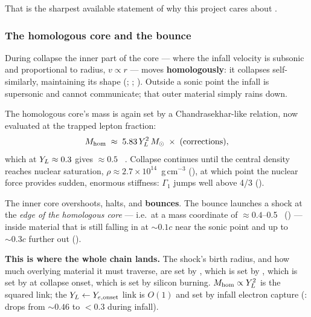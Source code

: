 That is the sharpest available statement of why this project cares about \Ye.

\subsubsection{The homologous core and the bounce}
\label{sec:homologous}

During collapse the inner part of the core --- where the infall velocity is
subsonic and proportional to radius, $v \propto r$ --- moves
\textbf{homologously}: it collapses self-similarly, maintaining its shape
(\citealt{goldreich1980}; \citealt{yahil1983}; \citealt{janka2017}). Outside a
sonic point the infall is supersonic and cannot communicate; that outer
material simply rains down.

The homologous core's mass is again set by a Chandrasekhar-like relation, now
evaluated at the trapped lepton fraction:
%
\begin{equation}
M_{\mathrm{hom}} \;\approx\; 5.83\,Y_{L}^{2}\,M_{\odot} \;\times\;(\text{corrections}),
\label{eq:mhom}
\end{equation}
%
which at $Y_{L} \approx 0.3$ gives $\approx 0.5$~\Msun{} .
Collapse continues until the central density reaches nuclear saturation,
$\rho \approx 2.7 \times 10^{14}$~g\,cm$^{-3}$ (\citealt{janka2012, janka2017}),
at which point the nuclear force provides sudden, enormous stiffness:
$\Gamma_1$ jumps well above 4/3 (\citealt{janka2012}).

The inner core overshoots, halts, and \textbf{bounces}. The bounce launches a
shock at the \emph{edge of the homologous core} --- i.e.\ at a mass coordinate
of $\approx 0.4$--0.5~\Msun{} (\citealt{janka2012}) --- inside material that is
still falling in at $\sim 0.1c$ near the sonic point and up to $\sim 0.3c$
further out (\citealt{janka2017}).

\textbf{This is where the whole \Ye{} chain lands.} The shock's birth radius,
and how much overlying material it must traverse, are set by \Mhom, which is
set by \Yl, which is set by \Ye{} at collapse onset, which is set by silicon
burning. $M_{\mathrm{hom}} \propto Y_{L}^2$ is the squared link; the
$Y_{L} \leftarrow Y_{e,\mathrm{onset}}$ link is $O(1)$ and set by infall electron
capture (\citealt{janka2017}: \Ye{} drops from $\sim 0.46$ to $< 0.3$ during
infall).

